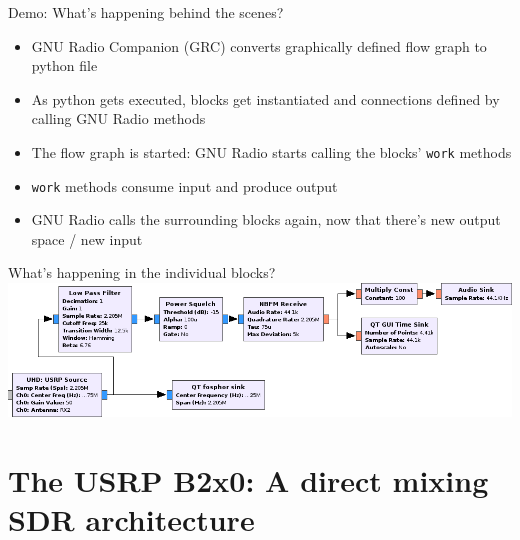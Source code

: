 \documentclass{beamer}
\begin{document}
\begin{frame}{Demo: What's happening behind the scenes?}
    \begin{itemize}
      \item GNU Radio Companion (GRC) converts graphically defined flow graph to python file
      \item As python gets executed, blocks get instantiated and connections defined by calling GNU Radio methods
      \item The flow graph is started: GNU Radio starts calling the blocks' \texttt{work} methods
      \item \texttt{work} methods consume input and produce output
      \item GNU Radio calls the surrounding blocks again, now that there's new output space / new input
    \end{itemize}
\end{frame}
\begin{frame}{What's happening in the individual blocks?}
  \includegraphics[width=\textwidth]{rxfg.png}
\end{frame}

\section{The USRP B2x0: A direct mixing SDR architecture}
\end{document}
